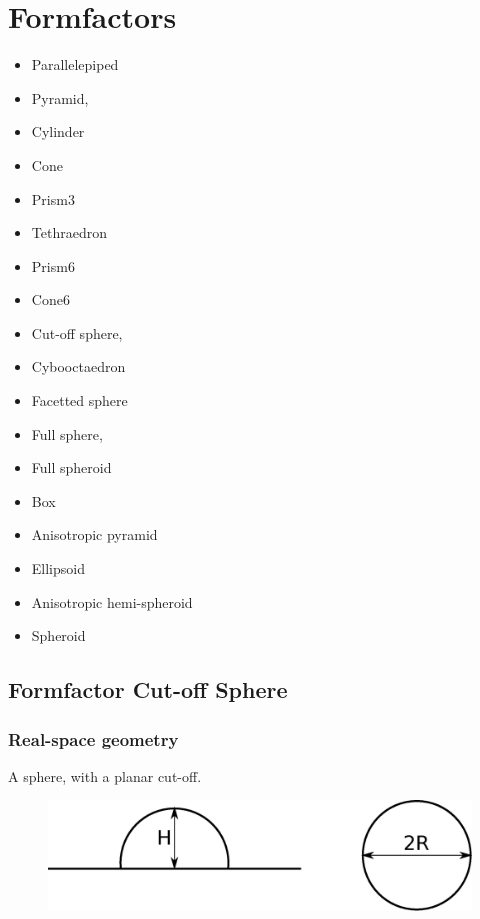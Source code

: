 \chapter{Formfactors}

\begin{itemize}
\item Parallelepiped
\item Pyramid,  
\item Cylinder
\item Cone
\item Prism3
\item Tethraedron
\item Prism6
\item Cone6
\item Cut-off sphere,  
\item Cybooctaedron
\item Facetted sphere  
\item Full sphere,  
\item Full spheroid 
\item Box
\item Anisotropic pyramid
\item Ellipsoid
\item Anisotropic hemi-spheroid
\item Spheroid
\end{itemize}

\newpage
\section{Formfactor Cut-off Sphere}
\subsection{Real-space geometry}

A sphere, with a planar cut-off.
\begin{figure}[!h]
\begin{center}
\includegraphics[width=0.6\columnwidth]{Figures/sphere}
\end{center}
\label{sphere}
\end{figure} 
\par
